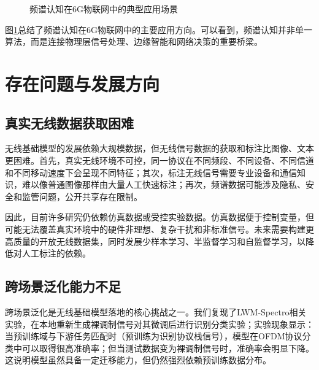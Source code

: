\documentclass[UTF8,fontset=windows,zihao=-4]{ctexart}
\begin{document}
\begin{figure}[H]
\centering
{}
\caption{频谱认知在6G物联网中的典型应用场景}
\label{fig:apps}
\end{figure}

图\ref{fig:apps}总结了频谱认知在6G物联网中的主要应用方向。可以看到，频谱认知并非单一算法，而是连接物理层信号处理、边缘智能和网络决策的重要桥梁。

\clearpage
\section{存在问题与发展方向}
\subsection{真实无线数据获取困难}
无线基础模型的发展依赖大规模数据，但无线信号数据的获取和标注比图像、文本更困难。首先，真实无线环境不可控，同一协议在不同频段、不同设备、不同信道和不同移动速度下会呈现不同特征；其次，标注无线信号需要专业设备和通信知识，难以像普通图像那样由大量人工快速标注；再次，频谱数据可能涉及隐私、安全和监管问题，公开共享存在限制。

因此，目前许多研究仍依赖仿真数据或受控实验数据。仿真数据便于控制变量，但可能无法覆盖真实环境中的硬件非理想、复杂干扰和非标准信号。未来需要构建更高质量的开放无线数据集，同时发展少样本学习、半监督学习和自监督学习，以降低对人工标注的依赖。

\subsection{跨场景泛化能力不足}
跨场景泛化是无线基础模型落地的核心挑战之一。我们复现了LWM-Spectro相关实验，在本地重新生成裸调制信号对其微调后进行识别分类实验；实验现象显示\cite{lwm}：当预训练域与下游任务匹配时（预训练为识别协议栈信号），模型在OFDM协议分类中可以取得很高准确率；但当测试数据变为裸调制信号时，准确率会明显下降。这说明模型虽然具备一定迁移能力，但仍然强烈依赖预训练数据分布。
\end{document}
